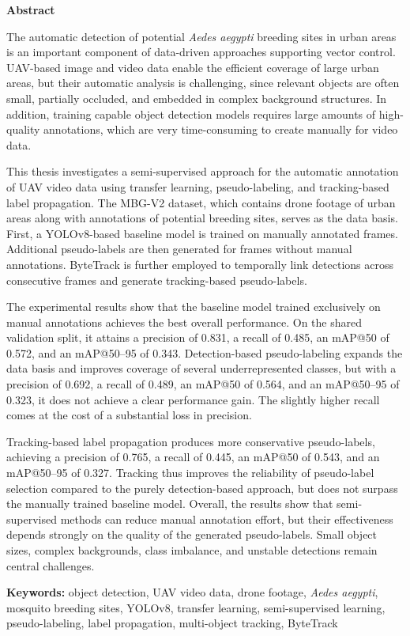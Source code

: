 \clearpage
\thispagestyle{empty}

\begin{center}
    {\Large \textbf{Abstract}}
\end{center}

\vspace{0.8cm}

\noindent The automatic detection of potential \textit{Aedes aegypti} breeding sites in urban areas is an important component of data-driven approaches supporting vector control. UAV-based image and video data enable the efficient coverage of large urban areas, but their automatic analysis is challenging, since relevant objects are often small, partially occluded, and embedded in complex background structures. In addition, training capable object detection models requires large amounts of high-quality annotations, which are very time-consuming to create manually for video data.

This thesis investigates a semi-supervised approach for the automatic annotation of UAV video data using transfer learning, pseudo-labeling, and tracking-based label propagation. The MBG-V2 dataset, which contains drone footage of urban areas along with annotations of potential breeding sites, serves as the data basis. First, a YOLOv8-based baseline model is trained on manually annotated frames. Additional pseudo-labels are then generated for frames without manual annotations. ByteTrack is further employed to temporally link detections across consecutive frames and generate tracking-based pseudo-labels.

The experimental results show that the baseline model trained exclusively on manual annotations achieves the best overall performance. On the shared validation split, it attains a precision of 0.831, a recall of 0.485, an mAP@50 of 0.572, and an mAP@50--95 of 0.343. Detection-based pseudo-labeling expands the data basis and improves coverage of several underrepresented classes, but with a precision of 0.692, a recall of 0.489, an mAP@50 of 0.564, and an mAP@50--95 of 0.323, it does not achieve a clear performance gain. The slightly higher recall comes at the cost of a substantial loss in precision.

Tracking-based label propagation produces more conservative pseudo-labels, achieving a precision of 0.765, a recall of 0.445, an mAP@50 of 0.543, and an mAP@50--95 of 0.327. Tracking thus improves the reliability of pseudo-label selection compared to the purely detection-based approach, but does not surpass the manually trained baseline model. Overall, the results show that semi-supervised methods can reduce manual annotation effort, but their effectiveness depends strongly on the quality of the generated pseudo-labels. Small object sizes, complex backgrounds, class imbalance, and unstable detections remain central challenges.

\vfill

\noindent\textbf{Keywords:} object detection, UAV video data, drone footage, \textit{Aedes aegypti}, mosquito breeding sites, YOLOv8, transfer learning, semi-supervised learning, pseudo-labeling, label propagation, multi-object tracking, ByteTrack

\newpage
